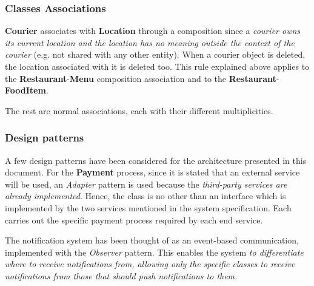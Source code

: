 \subsubsection{Classes Associations}
\textbf{Courier} associates with \textbf{Location} through a composition since a \textit{courier owns its current location and the location has no meaning outside the context of the courier} (e.g. not shared with any other entity). When a courier object is deleted, the location associated with it is deleted too.  
This rule explained above applies to the \textbf{Restaurant}-\textbf{Menu} composition association and to the \textbf{Restaurant}-\textbf{FoodItem}.

The rest are normal associations, each with their different multiplicities.

\subsubsection{Design patterns}

A few design patterns have been considered for the architecture presented in this document.
For the \textbf{Payment} process, since it is stated that an external service will be used, an \textit{Adapter} pattern is used because the \textit{third-party services are already implemented}. Hence, the  class is no other than an interface which is implemented by the two services mentioned in the system specification. Each carries out the specific payment process required by each end service.

The notification system has been thought of as an event-based communication, implemented with the \textit{Observer} pattern. This enables the system \textit{to differentiate where to receive notifications from, allowing only the specific classes to receive notifications from those that should push notifications to them.} 